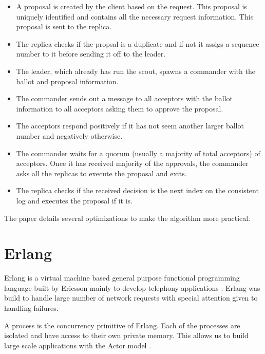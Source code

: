 \begin{itemize}
    \item A proposal is created by the client based on the request. This 
      proposal is uniquely identified and contains all the necessary request 
      information. This proposal is sent to the replica.
    \item The replica checks if the propsal is a duplicate and if not it
      assigs a sequence number%
      to it before sending it off to the leader.
    \item The leader, which already has run the scout, spawns a commander with
      the ballot and proposal information.
    \item The commander sends out a message to all acceptors with the ballot
      information to all acceptors asking them to approve the proposal.
    \item The acceptors respond positively if it has not seem another larger
      ballot number and negatively otherwise.
    \item The commander waits for a quorum (usually a majority of total 
      acceptors) of acceptors. Once it has received majority of the approvals,
      the commander asks all the replicas to execute the proposal and exits.
    \item The replica checks if the received decision is the next index on
      the consistent log and executes the proposal if it is.
\end{itemize}

The paper details several optimizations to make the algorithm more practical.

\section{Erlang}

Erlang \citep{erlang} is a virtual machine based general purpose functional 
programming language built by Ericsson mainly to develop telephony applications 
\citep{Armstrong07}. Erlang was build to handle large number of network
requests with special attention given to handling failures.

A process is the concurrency primitive of Erlang. Each of the processes are 
isolated and have access to their own private memory. This allows us to build
large scale applications with the Actor model%
\citep{Clinger81}.

